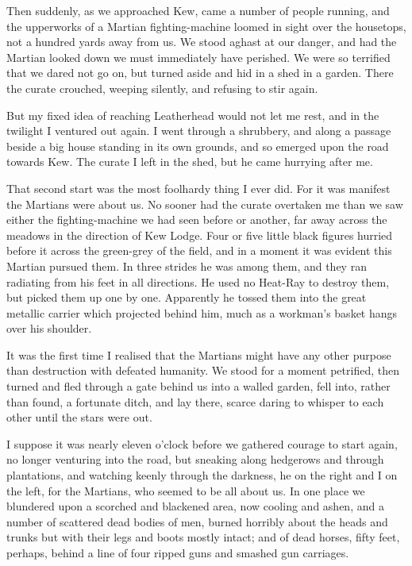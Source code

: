 Then suddenly, as we approached Kew, came a number of people
running, and the upperworks of a Martian fighting-machine loomed in
sight over the housetops, not a hundred yards away from us. We
stood aghast at our danger, and had the Martian looked down we must
immediately have perished. We were so terrified that we dared not
go on, but turned aside and hid in a shed in a garden. There the
curate crouched, weeping silently, and refusing to stir again.

But my fixed idea of reaching Leatherhead would not let me rest,
and in the twilight I ventured out again. I went through a
shrubbery, and along a passage beside a big house standing in its
own grounds, and so emerged upon the road towards Kew. The curate I
left in the shed, but he came hurrying after me.

That second start was the most foolhardy thing I ever did. For it
was manifest the Martians were about us. No sooner had the curate
overtaken me than we saw either the fighting-machine we had seen
before or another, far away across the meadows in the direction of
Kew Lodge. Four or five little black figures hurried before it
across the green-grey of the field, and in a moment it was evident
this Martian pursued them. In three strides he was among them, and
they ran radiating from his feet in all directions. He used no
Heat-Ray to destroy them, but picked them up one by one. Apparently
he tossed them into the great metallic carrier which projected
behind him, much as a workman's basket hangs over his shoulder.

It was the first time I realised that the Martians might have any
other purpose than destruction with defeated humanity. We stood for
a moment petrified, then turned and fled through a gate behind us
into a walled garden, fell into, rather than found, a fortunate
ditch, and lay there, scarce daring to whisper to each other until
the stars were out.

I suppose it was nearly eleven o'clock before we gathered courage
to start again, no longer venturing into the road, but sneaking
along hedgerows and through plantations, and watching keenly
through the darkness, he on the right and I on the left, for the
Martians, who seemed to be all about us. In one place we blundered
upon a scorched and blackened area, now cooling and ashen, and a
number of scattered dead bodies of men, burned horribly about the
heads and trunks but with their legs and boots mostly intact; and
of dead horses, fifty feet, perhaps, behind a line of four ripped
guns and smashed gun carriages.

